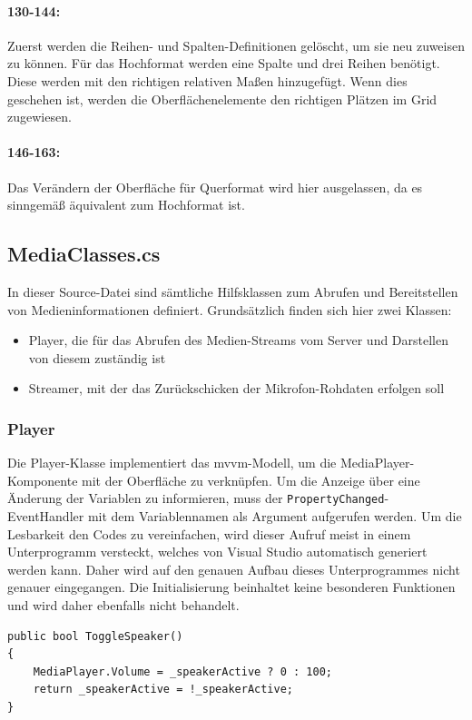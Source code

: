 \paragraph{130-144:} Zuerst werden die Reihen- und Spalten-Definitionen gelöscht, um sie neu zuweisen zu können.
Für das Hochformat werden eine Spalte und drei Reihen benötigt.
Diese werden mit den richtigen relativen Maßen hinzugefügt.
Wenn dies geschehen ist, werden die Oberflächenelemente den richtigen Plätzen im Grid zugewiesen.
\paragraph{146-163:} Das Verändern der Oberfläche für Querformat wird hier ausgelassen, da es sinngemäß äquivalent zum Hochformat ist.
\subsection{MediaClasses.cs}
\label{ssec:classes}
In dieser Source-Datei sind sämtliche Hilfsklassen zum Abrufen und Bereitstellen von Medieninformationen definiert.
Grundsätzlich finden sich hier zwei Klassen:
\begin{itemize}
    \item Player, die für das Abrufen des Medien-Streams vom Server und Darstellen von diesem zuständig ist
    \item Streamer, mit der das Zurückschicken der Mikrofon-Rohdaten erfolgen soll
\end{itemize}
\subsubsection{Player}
Die Player-Klasse implementiert das \ac{mvvm}-Modell, um die MediaPlayer-Komponente mit der Oberfläche zu verknüpfen.
Um die Anzeige über eine Änderung der Variablen zu informieren, muss der \texttt{PropertyChanged}-EventHandler mit dem Variablennamen als Argument aufgerufen werden.
Um die Lesbarkeit den Codes zu vereinfachen, wird dieser Aufruf meist in einem Unterprogramm versteckt, welches von Visual Studio automatisch generiert werden kann.
Daher wird auf den genauen Aufbau dieses Unterprogrammes nicht genauer eingegangen.
Die Initialisierung beinhaltet keine besonderen Funktionen und wird daher ebenfalls nicht behandelt.

\begin{verbatim}
public bool ToggleSpeaker()
{
    MediaPlayer.Volume = _speakerActive ? 0 : 100;
    return _speakerActive = !_speakerActive;
}
\end{verbatim}
